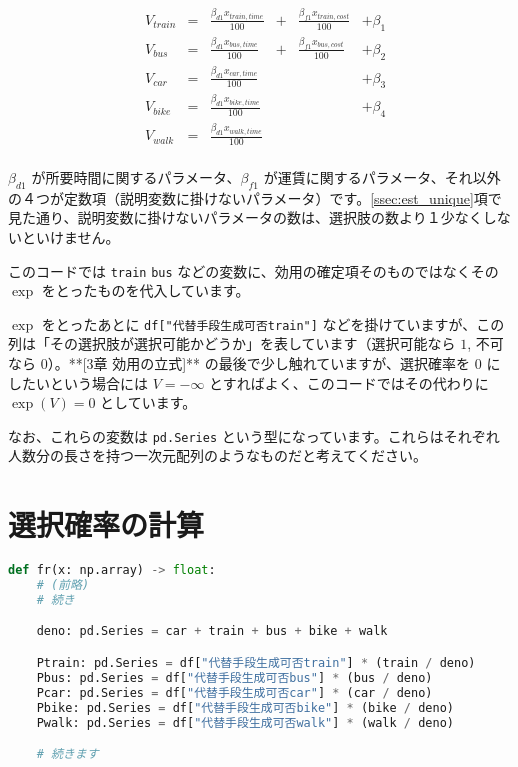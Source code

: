 \begin{equation}
    \label{eq:utility_sample}
    \begin{aligned}
         & V_{train} & = & \frac{\beta_{d1} x_{train, time}}{100} & + & \frac{\beta_{f1} x_{train, cost}}{100} & + \beta_1 \\
         & V_{bus}   & = & \frac{\beta_{d1} x_{bus, time}}{100}   & + & \frac{\beta_{f1} x_{bus, cost}}{100}   & + \beta_2 \\
         & V_{car}   & = & \frac{\beta_{d1} x_{car, time}}{100}   &   &                                        & + \beta_3 \\
         & V_{bike}  & = & \frac{\beta_{d1} x_{bike, time}}{100}  &   &                                        & + \beta_4 \\
         & V_{walk}  & = & \frac{\beta_{d1} x_{walk, time}}{100}                                                           \\
    \end{aligned}
\end{equation}



$\beta_{d1}$ が所要時間に関するパラメータ、$\beta_{f1}$ が運賃に関するパラメータ、それ以外の４つが定数項（説明変数に掛けないパラメータ）です。\ref{ssec:est_unique}項で見た通り、説明変数に掛けないパラメータの数は、選択肢の数より１少なくしないといけません。

このコードでは \lstinline{train} \lstinline{bus} などの変数に、効用の確定項そのものではなくその $\exp$ をとったものを代入しています。

$\exp$ をとったあとに \lstinline{df["代替手段生成可否train"]} などを掛けていますが、この列は「その選択肢が選択可能かどうか」を表しています（選択可能なら $1$, 不可なら $0$）。**[3章 効用の立式]** の最後で少し触れていますが、選択確率を $0$ にしたいという場合には $V=-\infty$ とすればよく、このコードではその代わりに $\exp(V)=0$ としています。

なお、これらの変数は \lstinline{pd.Series} という型になっています。これらはそれぞれ人数分の長さを持つ一次元配列のようなものだと考えてください。

\section{選択確率の計算}

\begin{lstlisting}[language=Python]
def fr(x: np.array) -> float:
    # (前略)
    # 続き

    deno: pd.Series = car + train + bus + bike + walk

    Ptrain: pd.Series = df["代替手段生成可否train"] * (train / deno)
    Pbus: pd.Series = df["代替手段生成可否bus"] * (bus / deno)
    Pcar: pd.Series = df["代替手段生成可否car"] * (car / deno)
    Pbike: pd.Series = df["代替手段生成可否bike"] * (bike / deno)
    Pwalk: pd.Series = df["代替手段生成可否walk"] * (walk / deno)

    # 続きます
\end{lstlisting}

